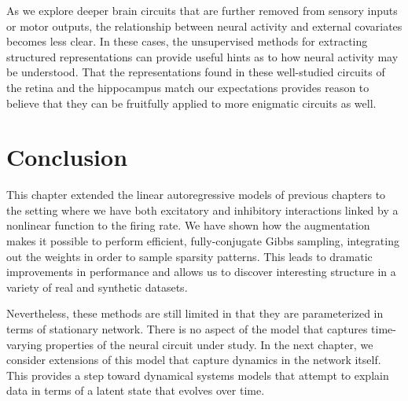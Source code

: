 As we explore deeper brain circuits that are further removed from
sensory inputs or motor outputs, the relationship between neural activity
and external covariates becomes less clear. In these cases, the unsupervised
methods for extracting structured representations can provide useful
hints as to how neural activity may be understood. That the representations
found in these well-studied circuits of the retina and the hippocampus
match our expectations provides reason to believe that they can be
fruitfully applied to more enigmatic circuits as well.

\section{Conclusion}
This chapter extended the linear autoregressive models of previous
chapters to the setting where we have both excitatory and inhibitory
interactions linked by a nonlinear function to the firing rate. We have
shown how the \polyagamma augmentation makes it possible to perform
efficient, fully-conjugate Gibbs sampling, integrating out the weights
in order to sample sparsity patterns. This leads to dramatic improvements
in performance and allows us to discover interesting structure in a
variety of real and synthetic datasets.

Nevertheless, these methods are still limited in that they are
parameterized in terms of stationary network. There is no aspect of
the model that captures time-varying properties of the neural circuit under
study. In the next chapter, we consider extensions of this model that
capture dynamics in the network itself. This provides a step toward
dynamical systems models that attempt to explain data in terms of a
latent state that evolves over time.
